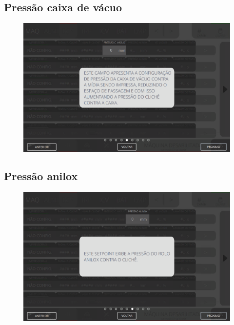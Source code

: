\subsection{Pressão caixa de vácuo}
\begin{figure}
    \centering
    \includegraphics[width=576 px,height=360 px]{src/imagesICV/04-printters/01-printters/settings/5.png}
\end{figure}
\newpage
\thispagestyle{fancy}
\vspace{\fill}

\subsection{Pressão anilox}
\begin{figure}
    \centering
    \includegraphics[width=576 px,height=360 px]{src/imagesICV/04-printters/01-printters/settings/6.png}
\end{figure}
\newpage
\thispagestyle{fancy}
\vspace{\fill}

